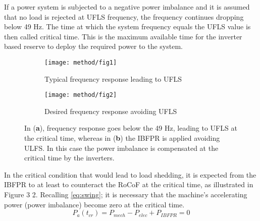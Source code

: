 If a power system is subjected to a negative power imbalance and it is assumed that no load is rejected at UFLS frequency, the frequency continues dropping below 49 Hz. The time at which the system frequency equals the UFLS value is then called critical time. This is the maximum available time for the inverter based reserve to deploy the required power to the system. \\

\begin{figure}[h]
	\centering
	\begin{subfigure}[h]{0.45\textwidth}
		\label{fig:freqresp_before}
		\centering
		\texttt{[image: method/fig1]}
		\caption{Typical frequency response leading to UFLS}	
	\end{subfigure}
	\hfill
	\begin{subfigure}[h]{0.45\textwidth}
		\centering
		\label{fig:freqresp_after}
		\texttt{[image: method/fig2]}	
		\caption{Desired frequency response avoiding UFLS}
	\end{subfigure}
	
	
	\caption{In (\textbf{a}), frequency response goes below the 49 Hz, leading to UFLS at the critical time, whereas in (\textbf{b}) the IBFPR is applied avoiding ULFS. In this case the power imbalance is compensated at the critical time by the inverters.}
\end{figure} 

In the critical condition that would lead to load shedding, it is expected from the IBFPR to at least to counteract the RoCoF at the critical time, as illustrated in Figure 3 2.
Recalling \eqref{eq:swing}; it is necessary that the machine’s accelerating power (power imbalance) become zero at the critical time.
\begin{equation}
	\label{eq:powerbalance}
	P_a (t_{cr} )=P_{mech}-P_{elec}+P_{IBFPR}=0
\end{equation} 

